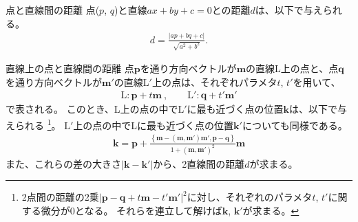 \clearpage
\begin{Formula}{点と直線間の距離}
点($p$, $q$)と直線$ax+by+c=0$との距離$d$は、以下で与えられる。
\begin{align*}
  d = \frac{|ap+bq+c|}{\sqrt{a^2+b^2}}.
\end{align*}
\end{Formula}
\begin{Formula}{直線上の点と直線間の距離}
点$\boldsymbol p$を通り方向ベクトルが$\boldsymbol m$の直線L上の点と、点$\boldsymbol q$を通り方向ベクトルが$\boldsymbol m'$の直線$\mathrm L'$上の点は、それぞれパラメタ$t$, $t'$を用いて、
\begin{align*}
  \mathrm L: \boldsymbol p+t\boldsymbol m\ , \qquad
  \mathrm L': \boldsymbol q+t'\boldsymbol m'
\end{align*}
で表される。
このとき、L上の点の中で$\mathrm L'$に最も近づく点の位置$\boldsymbol k$は、以下で与えられる
\footnote{2点間の距離の2乗$|\boldsymbol p-\boldsymbol q+t\boldsymbol m-t'\boldsymbol m'|^2$に対し、それぞれのパラメタ$t$, $t'$に関する微分が0となる。
それらを連立して解けば$\boldsymbol k$, $\boldsymbol k'$が求まる。}。
$\mathrm L'$上の点の中でLに最も近づく点の位置$\boldsymbol k'$についても同様である。
\begin{align*}
  \boldsymbol k
  = \boldsymbol p
    +\frac{\left\{\boldsymbol m-(\boldsymbol m, \boldsymbol m')\boldsymbol m', \boldsymbol p-\boldsymbol q\right\}}
          {1+\left(\boldsymbol m, \boldsymbol m'\right)^2}\boldsymbol m
\end{align*}
また、これらの差の大きさ$\big|\boldsymbol k-\boldsymbol k'\big|$から、2直線間の距離$d$が求まる。
\end{Formula}
